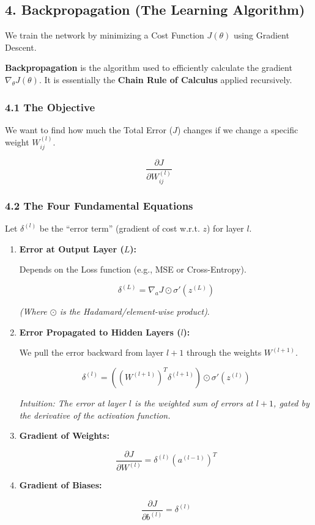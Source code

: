 \documentclass[
  italian,
  11pt,
]{article}
\begin{document}
\subsection{4. Backpropagation (The Learning
Algorithm)}\label{backpropagation-the-learning-algorithm}

We train the network by minimizing a Cost Function \(J(\theta)\) using
Gradient Descent.

\textbf{Backpropagation} is the algorithm used to efficiently calculate
the gradient \(\nabla_\theta J(\theta)\). It is essentially the
\textbf{Chain Rule of Calculus} applied recursively.

\subsubsection{4.1 The Objective}\label{the-objective-2}

We want to find how much the Total Error (\(J\)) changes if we change a
specific weight \(W_{ij}^{(l)}\).

\[\frac{\partial J}{\partial W_{ij}^{(l)}}\]

\subsubsection{4.2 The Four Fundamental
Equations}\label{the-four-fundamental-equations}

Let \(\delta^{(l)}\) be the ``error term'' (gradient of cost w.r.t.
\(z\)) for layer \(l\).

\begin{enumerate}
\def\labelenumi{\arabic{enumi}.}
\item
  \textbf{Error at Output Layer (\(L\)):}

  Depends on the Loss function (e.g., MSE or Cross-Entropy).

  \[\delta^{(L)} = \nabla_a J \odot \sigma'(z^{(L)})\]

  \emph{(Where \(\odot\) is the Hadamard/element-wise product)}.
\item
  \textbf{Error Propagated to Hidden Layers (\(l\)):}

  We pull the error backward from layer \(l+1\) through the weights
  \(W^{(l+1)}\).

  \[\delta^{(l)} = ((W^{(l+1)})^T \delta^{(l+1)}) \odot \sigma'(z^{(l)})\]

  \emph{Intuition: The error at layer \(l\) is the weighted sum of
  errors at \(l+1\), gated by the derivative of the activation
  function.}
\item
  \textbf{Gradient of Weights:}

  \[\frac{\partial J}{\partial W^{(l)}} = \delta^{(l)} (a^{(l-1)})^T\]
\item
  \textbf{Gradient of Biases:}

  \[\frac{\partial J}{\partial b^{(l)}} = \delta^{(l)}\]
\end{enumerate}
\end{document}
